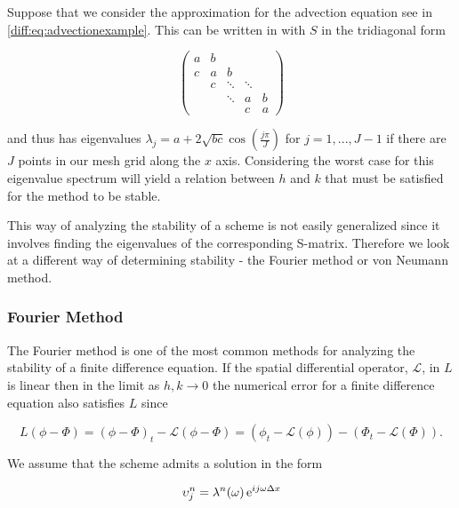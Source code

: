 \documentclass[../main.tex]{subfiles}
\begin{document}
  \begin{example}
    Suppose that we consider the approximation for the advection equation see in \autoref{diff:eq:advectionexample}. This can be written in with $S$ in the tridiagonal form

    \begin{equation}
      \begin{pmatrix}
        a & b & \\
        c & a & b \\
          & c & \ddots & \ddots & \\
          &   & \ddots & a & b \\
          &   &        & c & a
      \end{pmatrix}
    \end{equation}

    and thus has eigenvalues $\lambda_j = a + 2 \sqrt{bc} \cos{\left( \frac{j \pi}{J} \right)}$ for $j = 1, ... , J-1$ if there are $J$ points in our mesh grid along the $x$ axis. Considering the worst case for this eigenvalue spectrum will yield a relation between $h$ and $k$ that must be satisfied for the method to be stable.
  \end{example}

  This way of analyzing the stability of a scheme is not easily generalized since it involves finding the eigenvalues of the corresponding S-matrix. Therefore we look at a different way of determining stability - the Fourier method or von Neumann method.


  \subsubsection{Fourier Method}
  The Fourier method is one of the most common methods for analyzing the stability of a finite difference equation. If the spatial differential operator, $\mathcal{L}$, in $L$ is linear then in the limit as $h, k \to 0$ the numerical error for a finite difference equation also satisfies $L$ since

  $$
    L(\phi - \Phi) = (\phi - \Phi)_t - \mathcal{L}(\phi - \Phi) = (\phi_t - \mathcal{L}(\phi)) - (\Phi_t - \mathcal{L}(\Phi)).
  $$

  We assume that the scheme admits a solution in the form

  \begin{equation}
    \upsilon^n_j = \lambda^n(\omega) \operatorname{e}^{i j \omega \Delta x}
  \end{equation}
\end{document}
